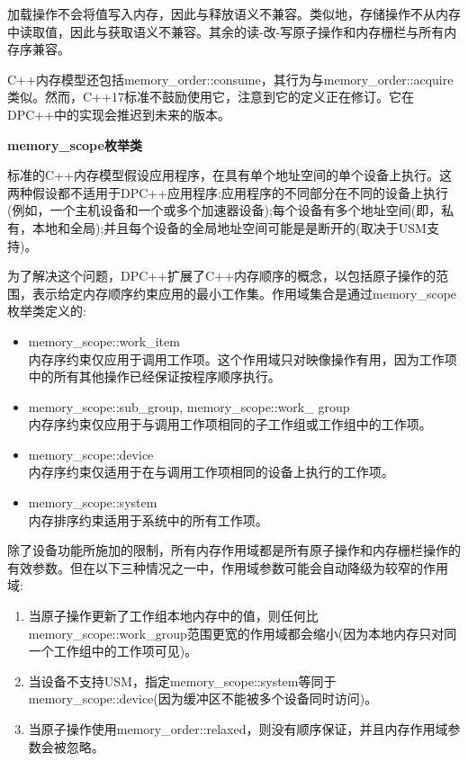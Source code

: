 加载操作不会将值写入内存，因此与释放语义不兼容。类似地，存储操作不从内存中读取值，因此与获取语义不兼容。其余的读-改-写原子操作和内存栅栏与所有内存序兼容。\par

\begin{tcolorbox}[colback=blue!5!white,colframe=blue!75!black, title=C++中的内存序]
C++内存模型还包括memory\_order::consume，其行为与memory\_order::acquire类似。然而，C++17标准不鼓励使用它，注意到它的定义正在修订。它在DPC++中的实现会推迟到未来的版本。
\end{tcolorbox}

\hspace*{\fill} \par %
\textbf{memory\_scope枚举类}

标准的C++内存模型假设应用程序，在具有单个地址空间的单个设备上执行。这两种假设都不适用于DPC++应用程序:应用程序的不同部分在不同的设备上执行(例如，一个主机设备和一个或多个加速器设备);每个设备有多个地址空间(即，私有，本地和全局);并且每个设备的全局地址空间可能是是断开的(取决于USM支持)。\par

为了解决这个问题，DPC++扩展了C++内存顺序的概念，以包括原子操作的范围，表示给定内存顺序约束应用的最小工作集。作用域集合是通过memory\_scope枚举类定义的:\par

\begin{itemize}
	\item memory\_scope::work\_item \\
	内存序约束仅应用于调用工作项。这个作用域只对映像操作有用，因为工作项中的所有其他操作已经保证按程序顺序执行。
	\item memory\_scope::sub\_group, memory\_scope::work\_
	group \\
	内存序约束仅应用于与调用工作项相同的子工作组或工作组中的工作项。
	\item memory\_scope::device \\ 
	内存序约束仅适用于在与调用工作项相同的设备上执行的工作项。
	\item memory\_scope::system \\
	内存排序约束适用于系统中的所有工作项。
\end{itemize}

除了设备功能所施加的限制，所有内存作用域都是所有原子操作和内存栅栏操作的有效参数。但在以下三种情况之一中，作用域参数可能会自动降级为较窄的作用域:\par

\begin{enumerate}
	\item 当原子操作更新了工作组本地内存中的值，则任何比memory\_scope::work\_group范围更宽的作用域都会缩小(因为本地内存只对同一个工作组中的工作项可见)。
	\item 当设备不支持USM，指定memory\_scope::system等同于memory\_scope::device(因为缓冲区不能被多个设备同时访问)。
	\item 当原子操作使用memory\_order::relaxed，则没有顺序保证，并且内存作用域参数会被忽略。
\end{enumerate}

